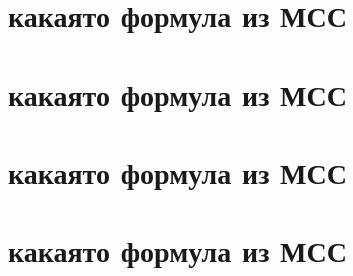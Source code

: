 \begin{multicols*}{2}
		\section{какаято формула из МСС}

		\section{какаято формула из МСС}

		\section{какаято формула из МСС}

		\section{какаято формула из МСС}

	\end{multicols*}

